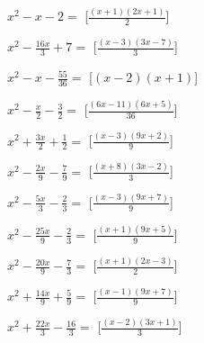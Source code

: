 \begin{esercizio}
\begin{multicols}{2}
\begin{enumeratea}

\item \(x^{2} - x - 2=\) 
\hfill [\(\frac{\left(x + 1\right) \left(2 x + 1\right)}{2}\)]
\item \(x^{2} - \frac{16 x}{3} + 7=\) 
\hfill [\(\frac{\left(x - 3\right) \left(3 x - 7\right)}{3}\)]
\item \(x^{2} - x - \frac{55}{36}=\) 
\hfill [\(\left(x - 2\right) \left(x + 1\right)\)]
\item \(x^{2} - \frac{x}{2} - \frac{3}{2}=\) 
\hfill [\(\frac{\left(6 x - 11\right) \left(6 x + 5\right)}{36}\)]
\item \(x^{2} + \frac{3 x}{2} + \frac{1}{2}=\) 
\hfill [\(\frac{\left(x - 3\right) \left(9 x + 2\right)}{9}\)]
\item \(x^{2} - \frac{2 x}{9} - \frac{7}{9}=\) 
\hfill [\(\frac{\left(x + 8\right) \left(3 x - 2\right)}{3}\)]
\item \(x^{2} - \frac{5 x}{3} - \frac{2}{3}=\) 
\hfill [\(\frac{\left(x - 3\right) \left(9 x + 7\right)}{9}\)]
\item \(x^{2} - \frac{25 x}{9} - \frac{2}{3}=\) 
\hfill [\(\frac{\left(x + 1\right) \left(9 x + 5\right)}{9}\)]
\item \(x^{2} - \frac{20 x}{9} - \frac{7}{3}=\) 
\hfill [\(\frac{\left(x + 1\right) \left(2 x - 3\right)}{2}\)]
\item \(x^{2} + \frac{14 x}{9} + \frac{5}{9}=\) 
\hfill [\(\frac{\left(x - 1\right) \left(9 x + 7\right)}{9}\)]
\item \(x^{2} + \frac{22 x}{3} - \frac{16}{3}=\) 
\hfill [\(\frac{\left(x - 2\right) \left(3 x + 1\right)}{3}\)]

\end{enumeratea}
\end{multicols}
\end{esercizio}
